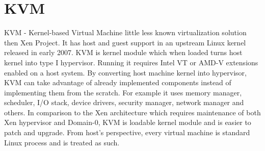 \section{KVM} \label{kvm}
KVM - Kernel-based Virtual Machine little less known virtualization solution then Xen Project. It has host and guest support in an upstream Linux kernel released in early 2007. KVM is kernel module which when loaded turns host kernel into type I hypervisor. Running it requires Intel VT or AMD-V extensions enabled on a host system. By converting host machine kernel into hypervisor, KVM can take advantage of already implemented components instead of implementing them from the scratch. For example it uses memory manager, scheduler, I/O stack, device drivers, security manager, network manager and others. In comparison to the Xen architecture which requires maintenance of both Xen hypervisor and Domain-0, KVM is loadable kernel module and is easier to patch and upgrade. From host's perspective, every virtual machine is standard Linux process and is treated as such.

